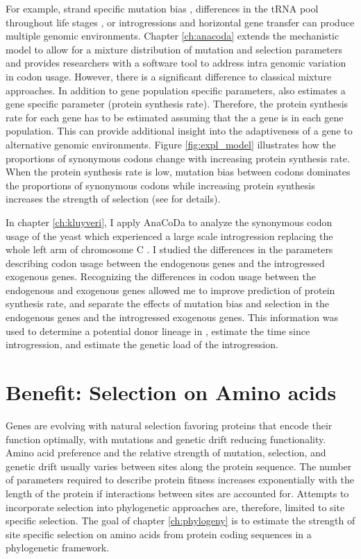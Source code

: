 For example, strand specific mutation bias \citep{Lafay1999,Romero2000}, differences in the tRNA pool throughout life stages \citep{sagi2016}, or introgressions and horizontal gene transfer \citep{medigue1991,lawrence1997} can produce multiple genomic environments.
Chapter \ref{ch:anacoda} extends the mechanistic model \ROC \cite{gilchrist2015} to allow for a mixture distribution of mutation and selection parameters \cite{landerer2018} and provides researchers with a software tool to address intra genomic variation in codon usage.
However, there is a significant difference to classical mixture approaches.
In addition to gene population specific parameters, \ROC also estimates a gene specific parameter (protein synthesis rate). 
Therefore, the protein synthesis rate for each gene has to be estimated assuming that the a gene is in each gene population.
This can provide additional insight into the adaptiveness of a gene to alternative genomic environments.
Figure \ref{fig:expl_model} illustrates how the proportions of synonymous codons change with increasing protein synthesis rate.
When the protein synthesis rate is low, mutation bias between codons dominates the proportions of synonymous codons while increasing protein synthesis increases the strength of selection (see \cite{gilchrist2015} for details). 

In chapter \ref{ch:kluyveri}, I apply AnaCoDa to analyze the synonymous codon usage of the yeast \kluyveri which experienced a large scale introgression replacing the whole left arm of chromosome C \citep{friedrich2015}.
I studied the differences in the parameters describing codon usage between the endogenous \kluyveri genes and the introgressed exogenous genes.
Recognizing the differences in codon usage between the endogenous and exogenous genes allowed me to improve prediction of protein synthesis rate, and separate the effects of mutation bias and selection in the endogenous \kluyveri genes and the introgressed exogenous genes.
This information was used to determine a potential donor lineage in \gossypii, estimate the time since introgression, and estimate the genetic load of the introgression.

\section{Benefit: Selection on Amino acids}
Genes are evolving with natural selection favoring proteins that encode their function optimally, with mutations and genetic drift reducing functionality.
Amino acid preference and the relative strength of mutation, selection, and genetic drift usually varies between sites along the protein sequence.
The number of parameters required to describe protein fitness increases exponentially with the length of the protein if interactions between sites are accounted for.
Attempts to incorporate selection into phylogenetic approaches are, therefore, limited to site specific selection.
The goal of chapter \ref{ch:phylogeny} is to estimate the strength of site specific selection on amino acids from protein coding sequences in a phylogenetic framework.

